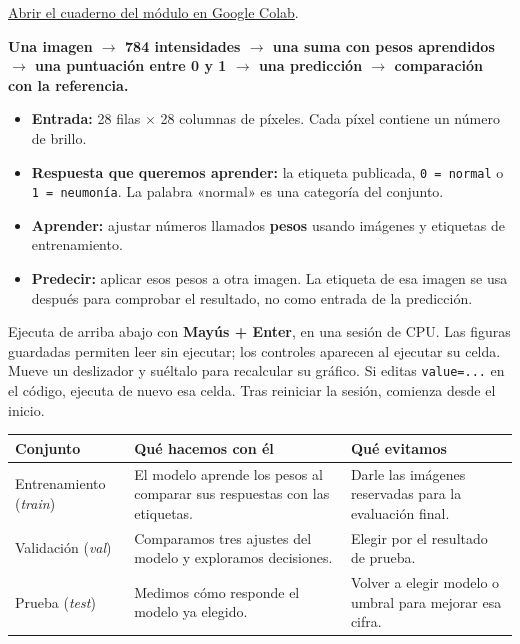 \href{https://colab.research.google.com/github/FisikMedik/taller-imagenes-medicas-python/blob/main/Modulo_ML_radiografias.ipynb}{Abrir el cuaderno del módulo en Google Colab}.


\textbf{Una imagen $\rightarrow$ 784 intensidades $\rightarrow$ una suma con pesos aprendidos $\rightarrow$ una puntuación entre 0 y 1 $\rightarrow$ una predicción $\rightarrow$ comparación con la referencia.}

\begin{itemize}
\item \textbf{Entrada:} 28 filas $\times$ 28 columnas de píxeles. Cada píxel contiene un número de brillo.
\item \textbf{Respuesta que queremos aprender:} la etiqueta publicada, \texttt{\small 0 =\allowbreak{} normal} o \texttt{\small 1 =\allowbreak{} neumonía}. La palabra «normal» es una categoría del conjunto.
\item \textbf{Aprender:} ajustar números llamados \textbf{pesos} usando imágenes y etiquetas de entrenamiento.
\item \textbf{Predecir:} aplicar esos pesos a otra imagen. La etiqueta de esa imagen se usa después para comprobar el resultado, no como entrada de la predicción.
\end{itemize}

Ejecuta de arriba abajo con \textbf{Mayús + Enter}, en una sesión de CPU. Las figuras guardadas permiten leer sin ejecutar; los controles aparecen al ejecutar su celda. Mueve un deslizador y suéltalo para recalcular su gráfico. Si editas \texttt{\small value=\allowbreak{}.\allowbreak{}.\allowbreak{}.\allowbreak{}} en el código, ejecuta de nuevo esa celda. Tras reiniciar la sesión, comienza desde el inicio.



\begin{tabularx}{\linewidth}{@{}YYY@{}}\toprule
Conjunto & Qué hacemos con él & Qué evitamos\\\midrule
Entrenamiento (\emph{train}) & El modelo aprende los pesos al comparar sus respuestas con las etiquetas. & Darle las imágenes reservadas para la evaluación final.\\
Validación (\emph{val}) & Comparamos tres ajustes del modelo y exploramos decisiones. & Elegir por el resultado de prueba.\\
Prueba (\emph{test}) & Medimos cómo responde el modelo ya elegido. & Volver a elegir modelo o umbral para mejorar esa cifra.\\\bottomrule\end{tabularx}

